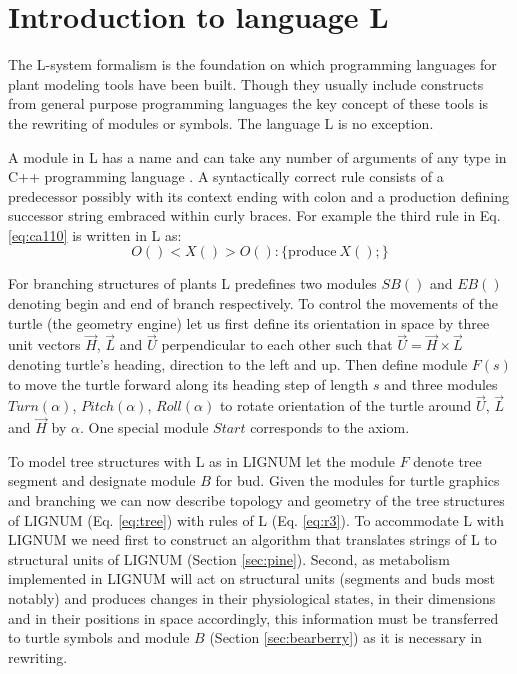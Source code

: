 \section{Introduction to language L}

The  L-system  formalism  is   the  foundation  on  which  programming
languages  for  plant modeling  tools  have  been  built. Though  they
usually include constructs  from general purpose programming languages
the key concept of these tools is the rewriting of modules or symbols.
The language L is no exception.

A module in L  has a name and can take any  number of arguments of any
type   in   C++   programming   language   \citep{stroustrup:97}.    A
syntactically correct rule consists of a predecessor possibly with its
context ending  with colon and a production  defining successor string
embraced  within curly  braces.  For  example  the third  rule in  Eq.
\ref{eq:ca110} is written in L as:
\begin{equation}\label{eq:r3}
 O() < X() > O(): \{\mathrm{produce}\ X();\}
\end{equation}

For branching structures of plants L predefines two modules $SB()$ and
$EB()$ denoting begin and end  of branch respectively.  To control the
movements of the turtle (the  geometry engine) let us first define its
orientation  in space by  three unit  vectors $\vec  H$, $\vec  L$ and
$\vec U$ perpendicular to each other such that $\vec U = \vec H \times
\vec L$ denoting turtle's heading,  direction to the left and up. Then
define module $F(s)$ to move the turtle forward along its heading step
of  length  $s$  and  three modules  $Turn(\alpha)$,  $Pitch(\alpha)$,
$Roll(\alpha)$ to  rotate orientation of  the turtle around  $\vec U$,
$\vec  L$  and $\vec  H$  by  $\alpha$.   One special  module  $Start$
corresponds to the axiom.

To model tree structures with L as in LIGNUM let the module $F$ denote
tree segment and designate module  $B$ for bud.  Given the modules for
turtle  graphics  and  branching  we  can now  describe  topology  and
geometry of  the tree structures  of LIGNUM (Eq.   \ref{eq:tree}) with
rules of  L (Eq.  \ref{eq:r3}). To  accommodate L with  LIGNUM we need
first  to construct  an  algorithm  that translates  strings  of L  to
structural  units  of  LIGNUM  (Section \ref{sec:pine}).   Second,  as
metabolism  implemented  in  LIGNUM   will  act  on  structural  units
(segments  and  buds  most  notably)  and produces  changes  in  their
physiological states,  in their dimensions  and in their  positions in
space  accordingly, this  information  must be  transferred to  turtle
symbols  and  module  $B$   (Section  \ref{sec:bearberry})  as  it  is
necessary in rewriting.

